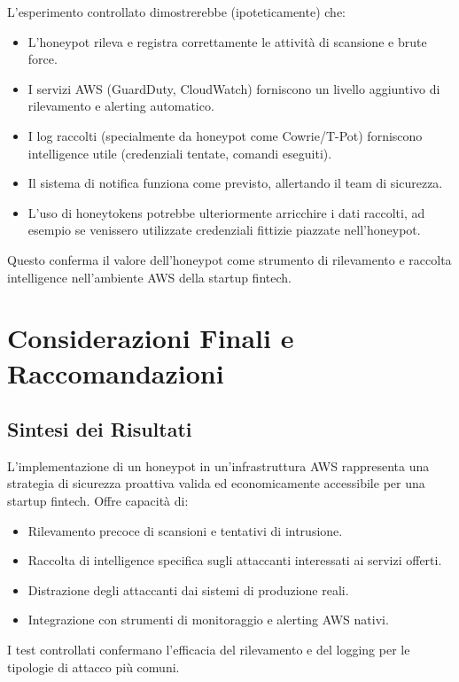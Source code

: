 L'esperimento controllato dimostrerebbe (ipoteticamente) che:
\begin{itemize}
    \item L'honeypot rileva e registra correttamente le attività di scansione e brute force.
    \item I servizi AWS (GuardDuty, CloudWatch) forniscono un livello aggiuntivo di rilevamento e alerting automatico.
    \item I log raccolti (specialmente da honeypot come Cowrie/T-Pot) forniscono intelligence utile (credenziali tentate, comandi eseguiti).
    \item Il sistema di notifica funziona come previsto, allertando il team di sicurezza.
    \item L'uso di honeytokens \cite{10183431} potrebbe ulteriormente arricchire i dati raccolti, ad esempio se venissero utilizzate credenziali fittizie piazzate nell'honeypot.
\end{itemize}
Questo conferma il valore dell'honeypot come strumento di rilevamento e raccolta intelligence nell'ambiente AWS della startup fintech.

\section{Considerazioni Finali e Raccomandazioni}
\label{sec:considerazioni_finali}

\subsection{Sintesi dei Risultati}
\label{subsec:sintesi_risultati}

L'implementazione di un honeypot in un'infrastruttura AWS rappresenta una strategia di sicurezza proattiva valida ed economicamente accessibile per una startup fintech. Offre capacità di:
\begin{itemize}
    \item Rilevamento precoce di scansioni e tentativi di intrusione.
    \item Raccolta di intelligence specifica sugli attaccanti interessati ai servizi offerti.
    \item Distrazione degli attaccanti dai sistemi di produzione reali.
    \item Integrazione con strumenti di monitoraggio e alerting AWS nativi.
\end{itemize}
I test controllati confermano l'efficacia del rilevamento e del logging per le tipologie di attacco più comuni.

